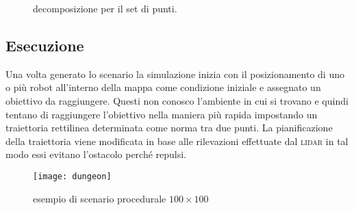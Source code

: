 \begin{figure}[!htb]
\centering
    \resizebox{0.7\linewidth}{!}{}
\caption{decomposizione per il set di punti.}
\label{fig:decomposizione}
\end{figure}

\subsection{Esecuzione}
Una volta generato lo scenario la simulazione inizia con il posizionamento di 
uno o più robot all'interno della mappa come condizione iniziale e assegnato un
obiettivo da raggiungere.
Questi non conosco l'ambiente in cui si trovano e quindi tentano di raggiungere 
l'obiettivo nella maniera più rapida impostando un traiettoria rettilinea 
determinata come norma tra due punti. 
La pianificazione della traiettoria viene modificata in base alle rilevazioni 
effettuate dal \textsc{lidar} in tal modo essi evitano l'ostacolo perché repulsi.

\begin{figure}[!htb]
\centering
\texttt{[image: dungeon]}
\caption{esempio di scenario procedurale $100\times100$}
\label{fig:dungeon}
\end{figure}